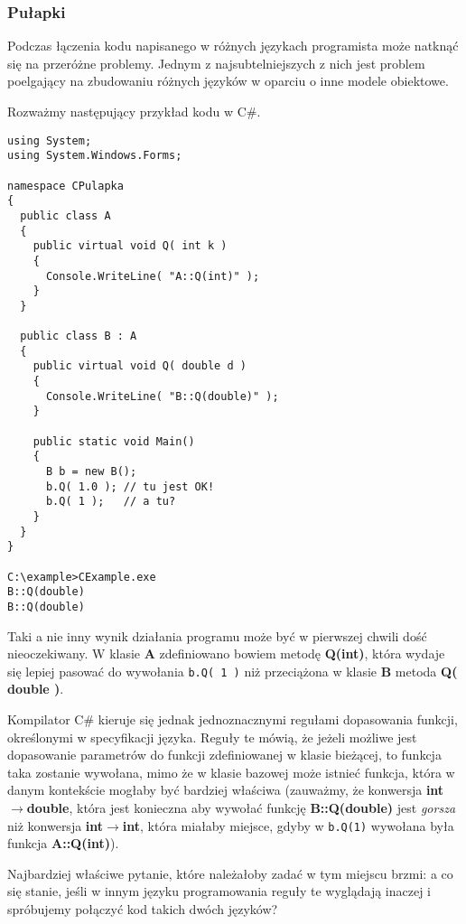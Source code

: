 \subsubsection{Pułapki}

Podczas łączenia kodu napisanego w różnych językach programista może natknąć się na przeróżne problemy.
Jednym z najsubtelniejszych z nich jest problem poelgający na zbudowaniu różnych języków w oparciu
o inne modele obiektowe.

Rozważmy następujący przykład kodu w C\#.

\begin{scriptsize}
\begin{verbatim}
using System;
using System.Windows.Forms;

namespace CPulapka
{
  public class A 
  {
    public virtual void Q( int k )
    {
      Console.WriteLine( "A::Q(int)" );
    }  
  }

  public class B : A
  {
    public virtual void Q( double d )
    {
      Console.WriteLine( "B::Q(double)" );
    }  

    public static void Main()
    {
      B b = new B();
      b.Q( 1.0 ); // tu jest OK!
      b.Q( 1 );   // a tu?
    }
  }
}

C:\example>CExample.exe
B::Q(double)
B::Q(double)
\end{verbatim}
\end{scriptsize}

Taki a nie inny wynik działania programu może być w pierwszej chwili dość nieoczekiwany. W klasie {\bf A} 
zdefiniowano bowiem metodę {\bf Q(int)}, która wydaje się lepiej pasować do wywołania {\tt b.Q( 1 )} niż
przeciążona w klasie {\bf B} metoda {\bf Q( double )}. 

Kompilator C\# kieruje się jednak jednoznacznymi regułami dopasowania funkcji, określonymi
w specyfikacji języka. Reguły te mówią, że jeżeli możliwe jest dopasowanie parametrów do funkcji
zdefiniowanej w klasie bieżącej, to funkcja taka zostanie wywołana, mimo że w klasie bazowej może istnieć
funkcja, która w danym kontekście mogłaby być bardziej właściwa (zauważmy, że konwersja 
{\bf int}$\rightarrow${\bf double}, która jest konieczna aby wywołać funkcję {\bf B::Q(double)} jest
{\em gorsza} niż konwersja {\bf int}$\rightarrow${\bf int}, która miałaby miejsce, gdyby 
w {\tt b.Q(1)} wywołana była funkcja {\bf A::Q(int)}).

Najbardziej właściwe pytanie, które należałoby zadać w tym miejscu brzmi: a co się stanie, jeśli
w innym języku programowania reguły te wyglądają inaczej i spróbujemy połączyć kod takich dwóch
języków?


